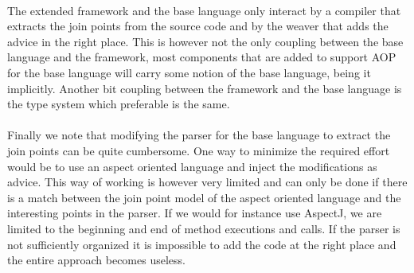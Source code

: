 \documentclass[a4paper]{report}
\begin{document}
\\
The extended framework and the base language only interact by a compiler that extracts the join points from the source code and by the weaver that adds the advice in the right place. This is however not the only coupling between the base language and the framework, most components that are added to support AOP for the base language will carry some notion of the base language, being it implicitly. Another bit coupling between the framework and the base language is the type system which preferable is the same.\\
\\
Finally we note that modifying the parser for the base language to extract the join points can be quite cumbersome. One way to minimize the required effort would be to use an aspect oriented language and inject the modifications as advice. This way of working is however very limited and can only be done if there is a match between the join point model of the aspect oriented language and the interesting points in the parser. If we would for instance use AspectJ, we are limited to the beginning and end of method executions and calls. If the parser is not sufficiently organized it is impossible to add the code at the right place and the entire approach becomes useless.
\end{document}
